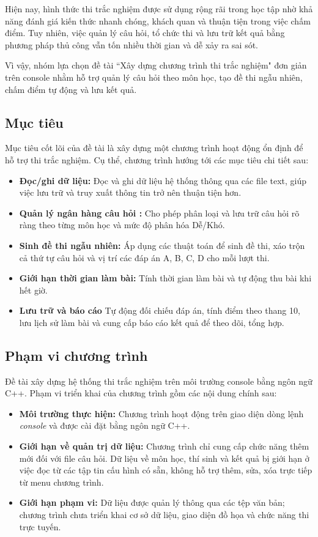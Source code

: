 \documentclass[12pt,a4paper]{report}
\begin{document}
Hiện nay, hình thức thi trắc nghiệm được sử dụng rộng rãi trong học tập nhờ khả năng đánh giá kiến thức nhanh chóng, khách quan và thuận tiện trong việc chấm điểm. Tuy nhiên, việc quản lý câu hỏi, tổ chức thi và lưu trữ kết quả bằng phương pháp thủ công vẫn tốn nhiều thời gian và dễ xảy ra sai sót.

Vì vậy, nhóm lựa chọn đề tài “Xây dựng chương trình thi trắc nghiệm" đơn giản trên console nhằm hỗ trợ quản lý câu hỏi theo môn học, tạo đề thi ngẫu nhiên, chấm điểm tự động và lưu kết quả.

\subsection{Mục tiêu}

Mục tiêu cốt lõi của đề tài là xây dựng một chương trình hoạt động ổn định để hỗ trợ thi trắc nghiệm. Cụ thể, chương trình hướng tới các mục tiêu chi tiết sau:

\begin{itemize}
    \item \textbf{Đọc/ghi dữ liệu:} Đọc và ghi dữ liệu hệ thống thông qua các file text, giúp việc lưu trữ và truy xuất thông tin trở nên thuận tiện hơn.
    \item \textbf{Quản lý ngân hàng câu hỏi :} Cho phép phân loại và lưu trữ câu hỏi rõ ràng theo từng môn học và mức độ phân hóa Dễ/Khó.
    \item \textbf{Sinh đề thi ngẫu nhiên:} Áp dụng các thuật toán để sinh đề thi, xáo trộn cả thứ tự câu hỏi và vị trí các đáp án A, B, C, D cho mỗi lượt thi.
    \item \textbf{Giới hạn thời gian làm bài:} Tính thời gian làm bài và tự động thu bài khi hết giờ.
    \item \textbf{Lưu trữ và báo cáo} Tự động đối chiếu đáp án, tính điểm theo thang 10, lưu lịch sử làm bài và cung cấp báo cáo kết quả để theo dõi, tổng hợp.
\end{itemize}

\subsection{Phạm vi chương trình}

Đề tài xây dựng hệ thống thi trắc nghiệm trên môi trường console bằng ngôn ngữ C++. Phạm vi triển khai của chương trình gồm các nội dung chính sau:

\begin{itemize}
    \item \textbf{Môi trường thực hiện:} Chương trình hoạt động trên giao diện dòng lệnh \textit{console} và được cài đặt bằng ngôn ngữ C++.
    \item \textbf{Giới hạn về quản trị dữ liệu:} Chương trình chỉ cung cấp chức năng thêm mới đối với file câu hỏi. Dữ liệu về môn học, thí sinh và kết quả bị giới hạn ở việc đọc từ các tập tin cấu hình có sẵn, không hỗ trợ thêm, sửa, xóa trực tiếp từ menu chương trình.
    \item \textbf{Giới hạn phạm vi:} Dữ liệu được quản lý thông qua các tệp văn bản; chương trình chưa triển khai cơ sở dữ liệu, giao diện đồ họa và chức năng thi trực tuyến.
\end{itemize}
\end{document}
